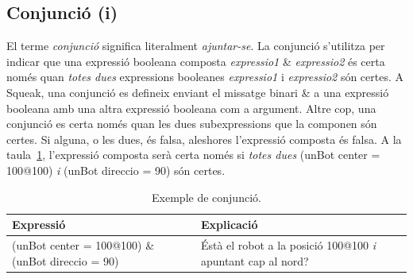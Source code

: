 
\subsection{Conjunció (i)}
El terme \emph{conjunció} significa literalment \emph{ajuntar-se}. La conjunció s'utilitza per indicar que una expressió booleana composta \textsf{{\itshape expressio1} \& {\itshape expressio2}} és certa només quan \emph{totes dues} expressions booleanes \textsf{{\itshape expressio1}} i \textsf{{\itshape expressio2}} són certes. A Squeak, una conjunció es defineix enviant el missatge binari \textsf{\&} a una expressió booleana amb una altra expressió booleana com a argument. Altre cop, una conjunció es certa només quan les dues subexpressions que la componen són certes. Si alguna, o les dues, és falsa, aleshores l'expressió composta és falsa.  A la taula~\ref{tab2003}, l'expressió composta serà certa només si \emph{totes dues} \textsf{(unBot center = 100@100)} \emph{i} \textsf{(unBot direccio = 90)} són certes.
\begin{table}[h]
\caption{Exemple de conjunció.}
\label{tab2003}
\setlength{\extrarowheight}{1mm}
{\small \begin{tabular}{p{70mm}p{70mm}}
\hline
\textbf{Expressió} & \textbf{Explicació} \\
\hline
\textsf{(unBot center = 100@100) \& (unBot direccio = 90)} & Éstà el robot a la posició \textsf{100@100} \emph{i} apuntant cap al nord? \\
\hline
\end{tabular}}
\end{table}


